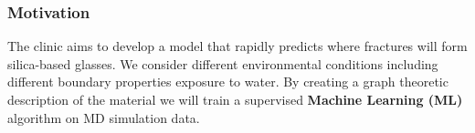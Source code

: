 
\frame
{
\frametitle{Motivation}
\begin{block}{}
The clinic aims to develop a model that rapidly predicts where fractures will form silica-based glasses. We consider different environmental conditions including different boundary properties exposure to water.
\newline
\newline
By creating a graph theoretic description of the material we will train a supervised \textbf{Machine Learning (ML)} algorithm on MD simulation data.
\end{block}
}


